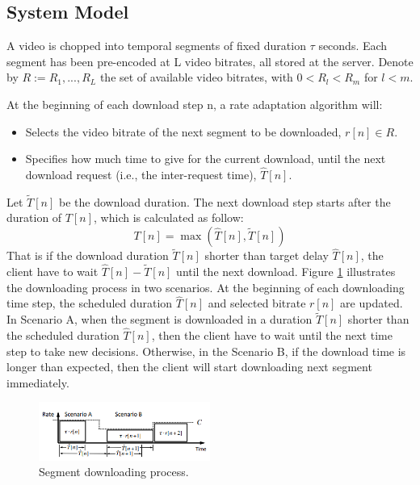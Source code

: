\documentclass[journal]{IEEEtran}
\begin{document}
\subsection{System Model}
A video is chopped into temporal segments of fixed duration $\tau$
seconds. Each segment has been pre-encoded at L video
bitrates, all stored at the server. Denote by $R := {R_1, ..., R_L}$
the set of available video bitrates, with $0 < R_l < R_m$ for
$l < m$.
\par At the beginning of each download step n, a rate adaptation
algorithm will:
\begin{itemize}
	\item Selects the video bitrate of the next segment to be
	downloaded, $r[n] \in R$.
	\item Specifies how much time to give for the current download, until the next download request (i.e., the inter-request time), $\hat{T}[n]$.
\end{itemize}
\par Let $\tilde{T}[n]$ be
the download duration. The next download step starts after the duration of $T[n]$, which is calculated as follow:
\begin{equation}
T[n]=\max(\hat{T}[n],\tilde{T}[n])
\end{equation}
That is if the download duration $\tilde{T}[n]$ shorter than target delay $\hat{T}[n]$, the client have to wait $\hat{T}[n]-\tilde{T}[n]$ until the next download. Figure \ref{Download} illustrates the downloading process in two scenarios. At the beginning of each downloading time step, the scheduled duration $\hat{T}[n]$ and selected bitrate $r[n]$ are updated. In Scenario A, when the segment is downloaded in a duration $\tilde{T}[n]$ shorter than the scheduled duration $\hat{T}[n]$, then the client have to wait until the next time step to take new decisions. Otherwise, in the Scenario B, if the download time is longer than expected, then the client will start downloading next segment immediately.
\begin{figure}[!h]
\centering
\includegraphics[width=0.5\textwidth]{images/Download.PNG}
\captionsetup{justification=centering}
\caption{Segment downloading process.}
\label{Download}
\end{figure}
\end{document}
